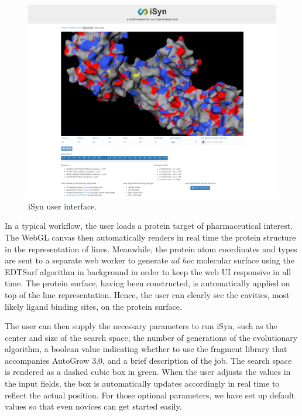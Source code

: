 \begin{figure}
\begin{center}
\includegraphics[width=\linewidth]{../isyn/UI.png}
\end{center}
\caption{iSyn user interface.}
\label{isyn:UI}
\end{figure}

In a typical workflow, the user loads a protein target of pharmaceutical interest. The WebGL canvas then automatically renders in real time the protein structure in the representation of lines. Meanwhile, the protein atom coordinates and types are sent to a separate web worker to generate \textit{ad hoc} molecular surface using the EDTSurf algorithm \citep{1297,1350} in background in order to keep the web UI responsive in all time. The protein surface, having been constructed, is automatically applied on top of the line representation. Hence, the user can clearly see the cavities, most likely ligand binding sites, on the protein surface.

The user can then supply the necessary parameters to run iSyn, such as the center and size of the search space, the number of generations of the evolutionary algorithm, a boolean value indicating whether to use the fragment library that accompanies AutoGrow 3.0, and a brief description of the job. The search space is rendered as a dashed cubic box in green. When the user adjusts the values in the input fields, the box is automatically updates accordingly in real time to reflect the actual position. For those optional parameters, we have set up default values so that even novices can get started easily.

